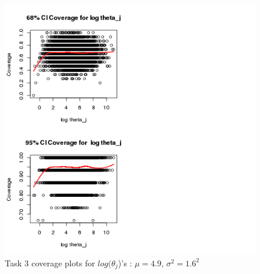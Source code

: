 \documentclass[paper=a4, fontsize=11pt]{scrartcl}
\begin{document}
\begin{figure}[h!]
  \caption{Task 3 coverage plots for $log(\theta_{j}$)'s : $\mu = 4.9$, $\sigma^2 = 1.6^2$}
  \centering
	\includegraphics[scale=1, trim = 0 0 200 0]{keskici_wxiao_ps2_task3_plot4.png}
\end{figure}
\end{document}
